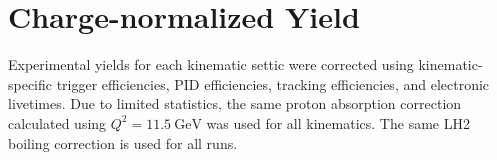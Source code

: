 \section{Charge-normalized Yield}
Experimental yields for each kinematic settic were corrected using
kinematic-specific trigger efficiencies, PID efficiencies, tracking
efficiencies, and electronic livetimes.
Due to limited statistics, the same proton absorption correction calculated
using $Q^2=\SI{11.5}{\giga\electronvolt}$ was used for all kinematics.
The same LH2 boiling correction is used for all runs.

